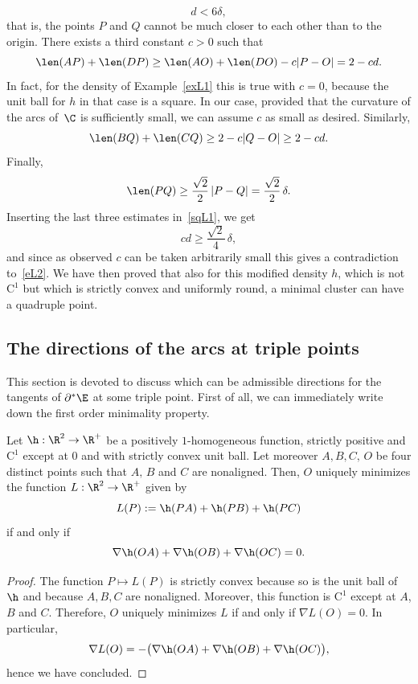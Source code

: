 \begin{example}
\begin{equation}
d< 6\delta,
\end{equation}
that is, the points $P$ and $Q$ cannot be much closer to each other than to the origin. There exists a third constant $c>0$ such that
\[
\len(AP)+\len(DP) \geq \len (AO)+\len(DO) - c|P-O|=2 - cd.
\]
In fact, for the density of Example~\ref{exL1} this is true with $c=0$, because the unit ball for $h$ in that case is a square. In our case, provided that the curvature of the arcs of~$\C$ is sufficiently small, we can assume $c$ as small as desired. Similarly,
\[
\len(BQ)+\len(CQ) \geq 2 - c|Q-O|\geq 2 - cd.
\]
Finally,\vspace*{-3pt}
\[
\len(PQ) \geq \frac{\sqrt 2}2\, |P-Q| = \frac{\sqrt 2}2\, \delta.
\]
Inserting the last three estimates in~\eqref{sqL1}, we get\vspace*{-3pt}
\[
cd \geq \frac{\sqrt 2}4\, \delta,
\]
and since as observed $c$ can be taken arbitrarily small this gives a contradiction to~\eqref{eL2}. We have then proved that also for this modified density $h$, which is not~$\mathrm{C}^1$ but which is strictly convex and uniformly round, a minimal cluster can have a quadruple point.
\end{example}

\subsection{The directions of the arcs at triple points\label{whichdir}}

This section is devoted to discuss which can be admissible directions for the tangents of $\partial^*\E$ at some triple point. First of all, we can immediately write down the first order minimality property.
\begin{lem}\label{qs}
Let $\h:\R^2\to\R^+$ be a positively $1$-homogeneous function, strictly positive and $\mathrm{C}^1$ except at $0$ and with strictly convex unit ball. Let moreover $A,B,C,\,O$ be four distinct points such that $A,\,B$ and $C$ are nonaligned. Then, $O$ uniquely minimizes the function $L:\R^2\to\R^+$ given by
\begin{equation}\label{Lgrosso}
L(P):= \h(PA)+\h(PB)+\h(PC)
\end{equation}
if and only if
\begin{equation}\label{1storder}
\nabla \h(OA)+\nabla\h(OB)+\nabla\h(OC)=0.
\end{equation}
\end{lem}
\begin{proof}
The function $P\mapsto L(P)$ is strictly convex because so is the unit ball of $\h$ and because $A,B,C$ are nonaligned. Moreover, this function is $\mathrm{C}^1$ except at $A$, $B$ and $C$. Therefore, $O$ uniquely minimizes $L$ if and only if $\nabla L(O)=0$. In particular,
\[
\nabla L(O) = -\big(\nabla \h(OA) +\nabla \h(OB) + \nabla \h(OC)\big),
\]
hence we have concluded.
\end{proof}

